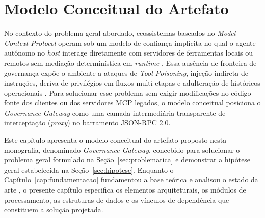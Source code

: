 \chapter{Modelo Conceitual do Artefato}
\label{cap:modelo_conceitual}

No contexto do problema geral abordado, ecossistemas baseados no \textit{Model Context Protocol} operam sob um modelo de confiança implícita no qual o agente autônomo no \textit{host} interage diretamente com servidores de ferramentas locais ou remotos sem mediação determinística em \textit{runtime} \cite{buhler2026agentbound,singh2026mcpsecure}. Essa ausência de fronteira de governança expõe o ambiente a ataques de \textit{Tool Poisoning}, injeção indireta de instruções, deriva de privilégios em fluxos multi-etapas e adulteração de históricos operacionais \cite{hasan2026mcp,hou2025mcp,jang2026hierarchical}. Para solucionar esse problema sem exigir modificações no código-fonte dos clientes ou dos servidores MCP legados, o modelo conceitual posiciona o \textit{Governance Gateway} como uma camada intermediária transparente de interceptação (\textit{proxy}) no barramento JSON-RPC 2.0.

Este capítulo apresenta o modelo conceitual do artefato proposto nesta monografia, denominado \textit{Governance Gateway}, concebido para solucionar o problema geral formulado na Seção~\ref{sec:problematica} e demonstrar a hipótese geral estabelecida na Seção~\ref{sec:hipotese}. Enquanto o Capítulo~\ref{cap:fundamentacao} fundamentou a base teórica e analisou o estado da arte \cite{hasan2026mcp,singh2026mcpsecure,guo2025measurement,hou2025mcp,jang2026hierarchical,buhler2026agentbound,zhang2025acfix}, o presente capítulo especifica os elementos arquiteturais, os módulos de processamento, as estruturas de dados e os vínculos de dependência que constituem a solução projetada.

